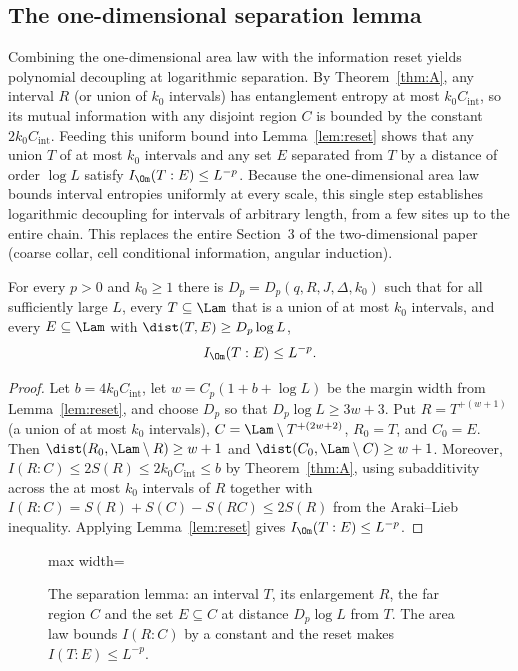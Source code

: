 \subsection{The one-dimensional separation lemma}\label{sec:logsep2}

\begin{inwords}
Combining the one-dimensional area law with the information reset yields
polynomial decoupling at logarithmic separation. By Theorem~\ref{thm:A}, any
interval $R$ (or union of $k_0$ intervals) has entanglement entropy at most
$k_0C_{\mathrm{int}}$, so its mutual information with any disjoint region $C$
is bounded by the constant $2k_0C_{\mathrm{int}}$. Feeding this uniform bound
into Lemma~\ref{lem:reset} shows that any union $T$ of at most $k_0$ intervals
and any set $E$ separated from $T$ by a distance of order $\log L$ satisfy
$I_\Om(T:E)\le L^{-p}$. Because the one-dimensional area law bounds interval
entropies uniformly at every scale, this single step establishes logarithmic
decoupling for intervals of arbitrary length, from a few sites up to the
entire chain. This replaces the entire Section~3 of the two-dimensional
paper (coarse collar, cell conditional information, angular induction).
\end{inwords}

\precisely
\begin{lemma}\label{lem:logsep}
For every $p>0$ and $k_0\ge1$ there is $D_p=D_p(q,R,J,\Delta,k_0)$ such that for
all sufficiently large $L$, every $T\subseteq\Lam$ that is a union of at most
$k_0$ intervals, and every $E\subseteq\Lam$ with $\dist(T,E)\ge D_p\log L$,
\[
 I_\Om(T:E)\le L^{-p}.
\]
\end{lemma}
\begin{proof}
Let $b=4k_0C_{\mathrm{int}}$, let $w=C_p(1+b+\log L)$ be the margin width from Lemma~\ref{lem:reset},
and choose $D_p$ so that $D_p\log L\ge 3w+3$. Put $R=T^{+(w+1)}$ (a union of at most $k_0$
intervals), $C=\Lam\setminus T^{+(2w+2)}$, $R_0=T$, and $C_0=E$. Then
$\dist(R_0,\Lam\setminus R)\ge w+1$ and $\dist(C_0,\Lam\setminus C)\ge w+1$. Moreover,
$I(R:C)\le 2S(R)\le 2k_0C_{\mathrm{int}}\le b$ by Theorem~\ref{thm:A},
using subadditivity across the at most $k_0$ intervals of $R$ together with
$I(R:C)=S(R)+S(C)-S(RC)\le 2S(R)$ from the Araki--Lieb inequality.
Applying Lemma~\ref{lem:reset} gives $I_\Om(T:E)\le L^{-p}$.
\end{proof}

\begin{figure}[t]
\centering
\begin{adjustbox}{max width=\linewidth}

\end{adjustbox}
\caption{The separation lemma: an interval $T$, its enlargement $R$, the far region $C$ and the set $E\subseteq C$ at distance $D_p\log L$ from $T$. The area law bounds $I(R:C)$ by a constant and the reset makes $I(T:E)\le L^{-p}$.}\label{fig:chain-logsep}
\end{figure}

